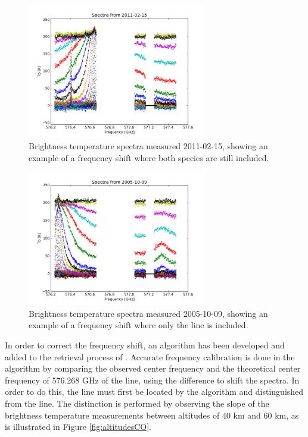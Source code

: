 \begin{figure}[ht!]
\begin{center}
\includegraphics[width=0.7\textwidth]{freq_corr_errorSpectrum2.png}
\caption{Brightness temperature spectra measured 2011-02-15, showing an example of a frequency shift where both species are still included.}
\label{fig:shiftExample1CO}
\end{center}
\end{figure}

\begin{figure}[ht!]
\begin{center}
\includegraphics[width=0.7\textwidth]{freq_corr_errorSpectrum1.png}
\caption{Brightness temperature spectra measured 2005-10-09, showing an example of a frequency shift where only the  line is included.}
\label{fig:shiftExample2CO}
\end{center}
\end{figure}

In order to correct the frequency shift, an algorithm has been developed and added to the retrieval process of . Accurate frequency calibration is done in the algorithm by comparing the observed center frequency and the theoretical center frequency of 576.268 GHz of the  line, using the difference to shift the spectra. In order to do this, the  line must first be located by the algorithm and distinguished from the  line. The distinction is performed by observing the slope of the brightness temperature measurements between altitudes of 40 km and 60 km, as is illustrated in Figure \ref{fig:altitudesCO}.

